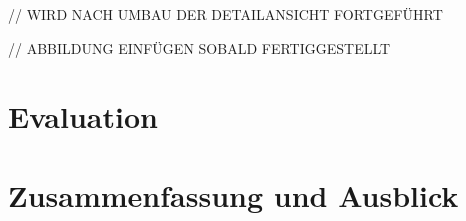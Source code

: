 \documentclass[11pt,a4paper, halfparskip]{scrartcl}
\begin{document}
// WIRD NACH UMBAU DER DETAILANSICHT FORTGEFÜHRT

// ABBILDUNG EINFÜGEN SOBALD FERTIGGESTELLT

\section{Evaluation}

\section{Zusammenfassung und Ausblick}


\newpage
\begin{footnotesize}


\begin{thebibliography}{99}







\end{thebibliography}
%
%



%
%

\end{footnotesize}
\end{document}

